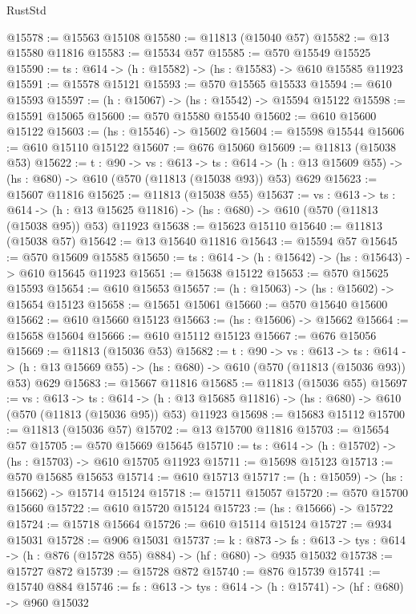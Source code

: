 \begin{lexlean}{RustStd}
\begin{coremodule}
@15578 := @15563 @15108
@15580 := @11813 (@15040 @57)
@15582 := @13 @15580 @11816
@15583 := @15534 @57
@15585 := @570 @15549 @15525
@15590 := {ts : @614} -> (h : @15582) -> (hs : @15583) -> @610 @15585 @11923
@15591 := @15578 @15121
@15593 := @570 @15565 @15533
@15594 := @610 @15593
@15597 := (h : @15067) -> (hs : @15542) -> @15594 @15122
@15598 := @15591 @15065
@15600 := @570 @15580 @15540
@15602 := @610 @15600 @15122
@15603 := (hs : @15546) -> @15602
@15604 := @15598 @15544
@15606 := @610 @15110 @15122
@15607 := @676 @15060
@15609 := @11813 (@15038 @53)
@15622 := {t : @90} ->
  {vs : @613} ->
  {ts : @614} -> (h : @13 @15609 @55) -> (hs : @680) -> @610 (@570 (@11813 (@15038 @93)) @53) @629
@15623 := @15607 @11816
@15625 := @11813 (@15038 @55)
@15637 := {vs : @613} ->
  {ts : @614} ->
  (h : @13 @15625 @11816) -> (hs : @680) -> @610 (@570 (@11813 (@15038 @95)) @53) @11923
@15638 := @15623 @15110
@15640 := @11813 (@15038 @57)
@15642 := @13 @15640 @11816
@15643 := @15594 @57
@15645 := @570 @15609 @15585
@15650 := {ts : @614} -> (h : @15642) -> (hs : @15643) -> @610 @15645 @11923
@15651 := @15638 @15122
@15653 := @570 @15625 @15593
@15654 := @610 @15653
@15657 := (h : @15063) -> (hs : @15602) -> @15654 @15123
@15658 := @15651 @15061
@15660 := @570 @15640 @15600
@15662 := @610 @15660 @15123
@15663 := (hs : @15606) -> @15662
@15664 := @15658 @15604
@15666 := @610 @15112 @15123
@15667 := @676 @15056
@15669 := @11813 (@15036 @53)
@15682 := {t : @90} ->
  {vs : @613} ->
  {ts : @614} -> (h : @13 @15669 @55) -> (hs : @680) -> @610 (@570 (@11813 (@15036 @93)) @53) @629
@15683 := @15667 @11816
@15685 := @11813 (@15036 @55)
@15697 := {vs : @613} ->
  {ts : @614} ->
  (h : @13 @15685 @11816) -> (hs : @680) -> @610 (@570 (@11813 (@15036 @95)) @53) @11923
@15698 := @15683 @15112
@15700 := @11813 (@15036 @57)
@15702 := @13 @15700 @11816
@15703 := @15654 @57
@15705 := @570 @15669 @15645
@15710 := {ts : @614} -> (h : @15702) -> (hs : @15703) -> @610 @15705 @11923
@15711 := @15698 @15123
@15713 := @570 @15685 @15653
@15714 := @610 @15713
@15717 := (h : @15059) -> (hs : @15662) -> @15714 @15124
@15718 := @15711 @15057
@15720 := @570 @15700 @15660
@15722 := @610 @15720 @15124
@15723 := (hs : @15666) -> @15722
@15724 := @15718 @15664
@15726 := @610 @15114 @15124
@15727 := @934 @15031
@15728 := @906 @15031
@15737 := {k : @873} ->
  {fs : @613} -> {tys : @614} -> (h : @876 (@15728 @55) @884) -> (hf : @680) -> @935 @15032
@15738 := @15727 @872
@15739 := @15728 @872
@15740 := @876 @15739
@15741 := @15740 @884
@15746 := {fs : @613} -> {tys : @614} -> (h : @15741) -> (hf : @680) -> @960 @15032

\end{coremodule}
\end{lexlean}
